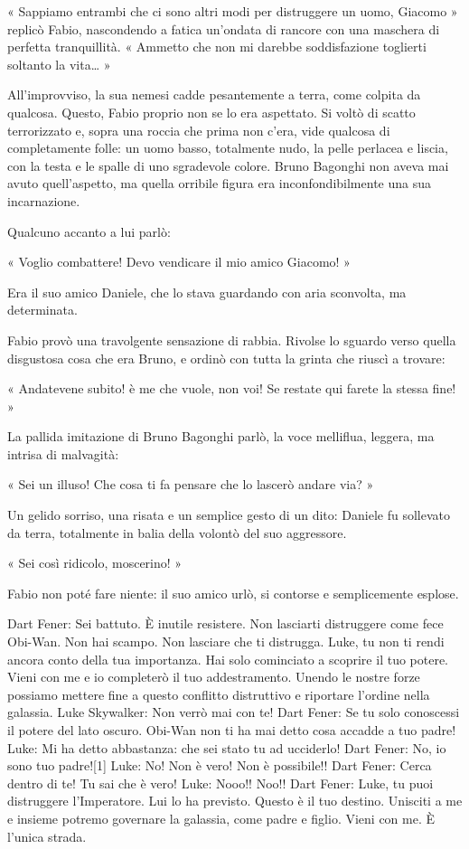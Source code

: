 « Sappiamo entrambi che ci sono altri modi per distruggere un uomo, Giacomo » replicò Fabio, nascondendo a fatica un'ondata di rancore con una maschera di perfetta tranquillità. « Ammetto che non mi darebbe soddisfazione toglierti soltanto la vita… »

All'improvviso, la sua nemesi cadde pesantemente a terra, come colpita da qualcosa. Questo, Fabio proprio non se lo era aspettato. Si voltò di scatto terrorizzato e, sopra una roccia che prima non c'era, vide qualcosa di completamente folle: un uomo basso, totalmente nudo, la pelle perlacea e liscia, con la testa e le spalle di uno sgradevole colore. Bruno Bagonghi non aveva mai avuto quell'aspetto, ma quella orribile figura era inconfondibilmente una sua incarnazione.

Qualcuno accanto a lui parlò:

« Voglio combattere! Devo vendicare il mio amico Giacomo! »

Era il suo amico Daniele, che lo stava guardando con aria sconvolta, ma determinata. 

Fabio provò una travolgente sensazione di rabbia. Rivolse lo sguardo verso quella disgustosa cosa che era Bruno, e ordinò con tutta la grinta che riuscì a trovare:

« Andatevene subito! è me che vuole, non voi! Se restate qui farete la stessa fine! »

La pallida imitazione di Bruno Bagonghi parlò, la voce melliflua, leggera, ma intrisa di malvagità:

« Sei un illuso! Che cosa ti fa pensare che lo lascerò andare via? »

Un gelido sorriso, una risata e un semplice gesto di un dito: Daniele fu sollevato da terra, totalmente in balia della volontò del suo aggressore.

« Sei così ridicolo, moscerino! »

Fabio non poté fare niente: il suo amico urlò, si contorse e semplicemente esplose. 

Dart Fener: Sei battuto. È inutile resistere. Non lasciarti distruggere come fece Obi-Wan. Non hai scampo. Non lasciare che ti distrugga. Luke, tu non ti rendi ancora conto della tua importanza. Hai solo cominciato a scoprire il tuo potere. Vieni con me e io completerò il tuo addestramento. Unendo le nostre forze possiamo mettere fine a questo conflitto distruttivo e riportare l'ordine nella galassia.
Luke Skywalker: Non verrò mai con te!
Dart Fener: Se tu solo conoscessi il potere del lato oscuro. Obi-Wan non ti ha mai detto cosa accadde a tuo padre!
Luke: Mi ha detto abbastanza: che sei stato tu ad ucciderlo!
Dart Fener: No, io sono tuo padre![1]
Luke: No! Non è vero! Non è possibile!!
Dart Fener: Cerca dentro di te! Tu sai che è vero!
Luke: Nooo!! Noo!!
Dart Fener: Luke, tu puoi distruggere l'Imperatore. Lui lo ha previsto. Questo è il tuo destino. Unisciti a me e insieme potremo governare la galassia, come padre e figlio. Vieni con me. È l'unica strada.